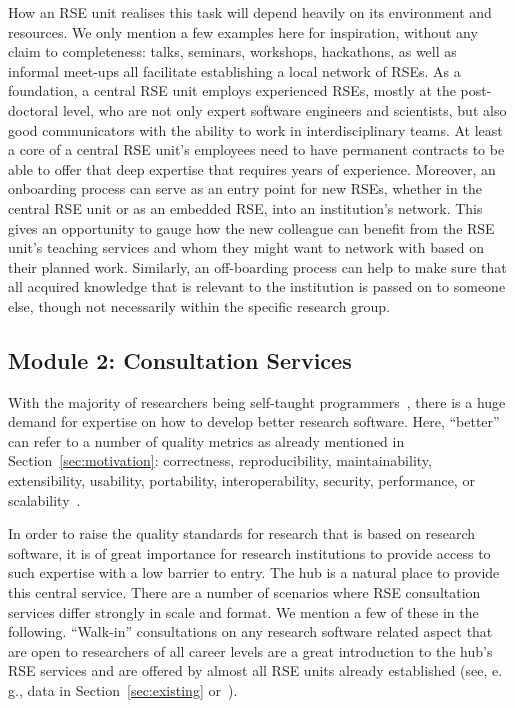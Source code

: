 \documentclass[a4paper]{article}
\newcommand*{\eg}{e.\,g.,\xspace}
\begin{document}
How an RSE unit realises this task will depend heavily on its environment and resources.
We only mention a few examples here for inspiration, without any claim to completeness:
talks, seminars, workshops, hackathons, as well as informal meet-ups all facilitate establishing a local network of RSEs.
As a foundation, a central RSE unit employs experienced RSEs, mostly at the post-doctoral level, who are not only expert software engineers and scientists, but also good communicators with the ability to work in interdisciplinary teams.
At least a core of a central RSE unit's employees need to have permanent contracts to be able to offer that deep expertise that requires years of experience.
Moreover, an onboarding process can serve as an entry point for new RSEs, whether in the central RSE unit or as an embedded RSE, into an institution's network.
This gives an opportunity to gauge how the new colleague can benefit from the RSE unit's teaching services and whom they might want to network with based on their planned work.
Similarly, an off-boarding process can help to make sure that all acquired knowledge that is relevant to the institution is passed on to someone else, though not necessarily within the specific research group.

\subsection{Module 2: Consultation Services}%
\label{sec:consultation}

With the majority of researchers being self-taught programmers~\autocite{Carver2013}, there is a huge demand for expertise on how to develop better research software.
Here, “better” can refer to a number of quality metrics as already mentioned in Section~\ref{sec:motivation}: correctness, reproducibility, maintainability, extensibility, usability, portability, interoperability, security, performance, or scalability~\autocite[Chapter 16]{Schulmeyer2008}.

In order to raise the quality standards for research that is based on research software, it is of great importance for research institutions to provide access to such expertise with a low barrier to entry.
The hub is a natural place to provide this central service.
There are a number of scenarios where RSE consultation services differ strongly in scale and format.
We mention a few of these in the following.
“Walk-in” consultations on any research software related aspect that are open to researchers of all career levels are a great introduction to the hub's RSE services and are offered by almost all RSE units already established (see, \eg{} data in Section~\ref{sec:existing} or~\cite{Katz2019}).
\end{document}
